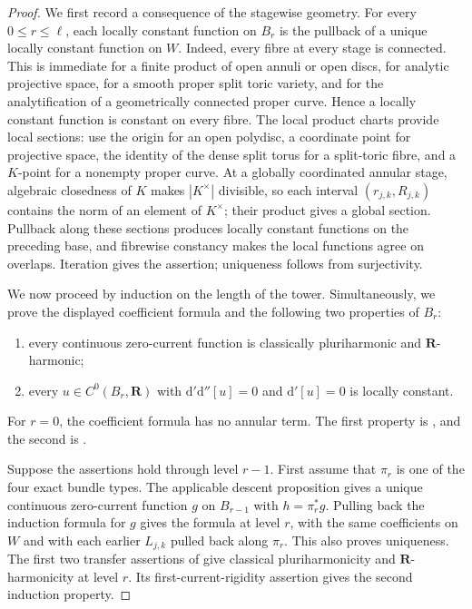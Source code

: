 \begin{proof}
We first record a consequence of the stagewise geometry.  For every
$0\leq r\leq\ell$, each locally constant function on $B_r$ is the pullback
of a unique locally constant function on $W$.  Indeed, every fibre at every
stage is connected.  This is immediate for a finite product of open annuli
or open discs, for analytic projective space, for a smooth proper split
toric variety, and for the analytification of a geometrically connected
proper curve.  Hence a locally constant function is constant on every
fibre.  The local product charts provide local sections: use the origin for
an open polydisc, a coordinate point for projective space, the identity of
the dense split torus for a split-toric fibre, and a $K$-point for a
nonempty proper curve.  At a globally
coordinated annular stage, algebraic closedness of $K$ makes $|K^\times|$
divisible, so each interval $(r_{j,k},R_{j,k})$ contains the norm of an
element of $K^\times$; their product gives a global section.  Pullback along
these sections produces locally constant functions on the preceding base,
and fibrewise constancy makes the local functions agree on overlaps.
Iteration gives the assertion; uniqueness follows from surjectivity.

We now proceed by induction on the length of the tower.  Simultaneously, we
prove the displayed coefficient formula and the following two properties of
$B_r$:
\begin{enumerate}
\item every continuous zero-current function is classically pluriharmonic
and $\mathbf R$-harmonic;
\item every $u\in C^0(B_r,\mathbf R)$ with
$\mathrm d'\mathrm d''[u]=0$ and $\mathrm d'[u]=0$ is locally constant.
\end{enumerate}
For $r=0$, the coefficient formula has no annular term.  The first property
is , and the second is
.

Suppose the assertions hold through level $r-1$.  First assume that
$\pi_r$ is one of the four exact bundle types.  The applicable descent
proposition gives a unique continuous zero-current function $g$ on
$B_{r-1}$ with $h=\pi_r^*g$.  Pulling back the induction formula for $g$
gives the formula at level $r$, with the same coefficients on $W$ and with
each earlier $L_{j,k}$ pulled back along $\pi_r$.  This also proves
uniqueness.  The first two transfer assertions of
 give classical
pluriharmonicity and $\mathbf R$-harmonicity at level $r$.  Its
first-current-rigidity assertion gives the second induction property.


\end{proof}
